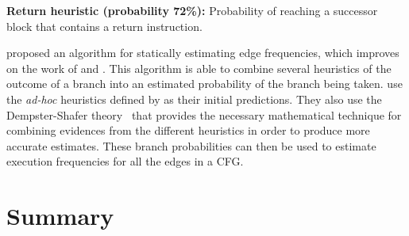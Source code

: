 \noindent\textbf{Return heuristic (probability 72\%):} Probability of reaching a successor block that contains a return instruction.


\cite{wu94} proposed an algorithm for statically estimating edge frequencies, which improves on the work of \cite{wagner94} and \cite{ball93}.
This algorithm is able to combine several heuristics of the outcome of a branch into an estimated probability of the branch being taken.
\cite{wu94} use the \textit{ad-hoc} heuristics defined by \cite{ball93} as their initial predictions.
They also use the Dempster-Shafer theory~\citep{shafer76} that provides the necessary mathematical technique for combining evidences from the different heuristics in order to produce more accurate estimates.
These branch probabilities can then be used to estimate execution frequencies
for all the edges in a CFG.

\section{Summary}
